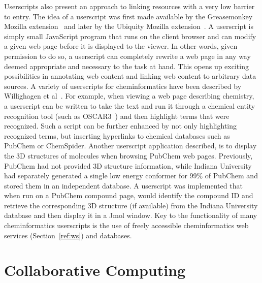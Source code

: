 \documentclass[11pt]{book}
\begin{document}
Userscripts also present an approach to linking resources with a very low
barrier to entry. The idea of a userscript was first made available by
the Greasemonkey Mozilla extension~\cite{url:greasemonkey} and
later by the Ubiquity Mozilla extension~\cite{url:ubiquity}.
A userscript is simply small JavaScript program that
runs on the client browser and can modify a given web page before it
is displayed to the viewer. In other words, given permission to do so,
a userscript can completely rewrite a web page in any way
deemed appropriate and necessary to the task at hand.
This opens up exciting possibilities in annotating web content
and linking web content to arbitrary data sources. A variety of
userscripts for cheminformatics have been described by Willighagen et
al~\cite{Willighagen2007b}. For example, when viewing a web page describing
chemistry, a userscript can be written to take the text and run it
through a chemical entity recognition tool (such as OSCAR3~\cite{Corbett2006}) and
then highlight terms that were recognized. Such a script can be further
enhanced by not only highlighting recognized terms, but inserting
hyperlinks to chemical databases such as PubChem or
ChemSpider. Another userscript application described, is to
display the 3D structures of molecules when browsing PubChem web pages.
Previously, PubChem had not provided 3D structure information, while
Indiana University had separately generated a single low energy
conformer for 99\% of PubChem and stored them in an independent database. A
userscript was implemented that when run on a PubChem compound page,
would identify the compound ID and retrieve the corresponding 3D
structure (if available) from the Indiana University database and then
display it in a Jmol window. Key to the functionality of many
cheminformatics userscripts is the use of freely accessible
cheminformatics web services (Section~\ref{ref:ws}) and databases.

\section{Collaborative Computing}
\end{document}
